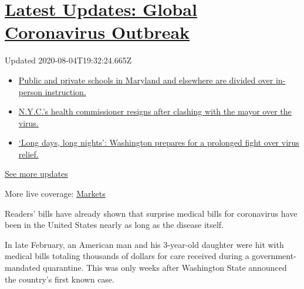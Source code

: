 \hypertarget{latest-updates-global-coronavirus-outbreak}{%
\section{\texorpdfstring{\href{https://www.nytimes3xbfgragh.onion/2020/08/04/world/coronavirus-cases.html?action=click\&pgtype=Article\&state=default\&region=MAIN_CONTENT_1\&context=storylines_live_updates}{Latest
Updates: Global Coronavirus
Outbreak}}{Latest Updates: Global Coronavirus Outbreak}}\label{latest-updates-global-coronavirus-outbreak}}

Updated 2020-08-04T19:32:24.665Z

\begin{itemize}
\tightlist
\item
  \href{https://www.nytimes3xbfgragh.onion/2020/08/04/world/coronavirus-cases.html?action=click\&pgtype=Article\&state=default\&region=MAIN_CONTENT_1\&context=storylines_live_updates\#link-4825b93}{Public
  and private schools in Maryland and elsewhere are divided over
  in-person instruction.}
\item
  \href{https://www.nytimes3xbfgragh.onion/2020/08/04/world/coronavirus-cases.html?action=click\&pgtype=Article\&state=default\&region=MAIN_CONTENT_1\&context=storylines_live_updates\#link-4d1eafa8}{N.Y.C.'s
  health commissioner resigns after clashing with the mayor over the
  virus.}
\item
  \href{https://www.nytimes3xbfgragh.onion/2020/08/04/world/coronavirus-cases.html?action=click\&pgtype=Article\&state=default\&region=MAIN_CONTENT_1\&context=storylines_live_updates\#link-6b644638}{`Long
  days, long nights': Washington prepares for a prolonged fight over
  virus relief.}
\end{itemize}

\href{https://www.nytimes3xbfgragh.onion/2020/08/04/world/coronavirus-cases.html?action=click\&pgtype=Article\&state=default\&region=MAIN_CONTENT_1\&context=storylines_live_updates}{See
more updates}

More live coverage:
\href{https://www.nytimes3xbfgragh.onion/live/2020/08/04/business/stock-market-today-coronavirus?action=click\&pgtype=Article\&state=default\&region=MAIN_CONTENT_1\&context=storylines_live_updates}{Markets}

Readers' bills have already shown that surprise medical bills for
coronavirus have been in the United States nearly as long as the disease
itself.

In late February, an American man and his 3-year-old daughter were hit
with medical bills totaling thousands of dollars for care received
during a government-mandated quarantine. This was only weeks after
Washington State announced the country's first known case.

